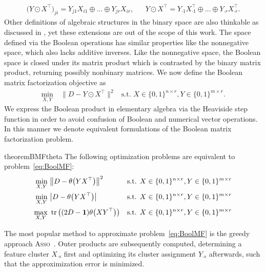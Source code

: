 \begin{align*}
    \bigl(Y\odot X^\top\bigr)_{ji}=Y_{j1}X_{i1}\oplus \ldots \oplus Y_{jr}X_{ir},&& Y\odot X^\top = Y_{\cdot 1}X_{\cdot 1}^\top\oplus \ldots \oplus Y_{\cdot r}X_{\cdot r}^\top.
\end{align*}
Other definitions of algebraic structures in the binary space are also thinkable as discussed in \cite{miettinen2015generalized}, yet these extensions are out of the scope of this work.
The space defined via the Boolean operations has similar properties like the nonnegative space, which also lacks additive inverses. Like the nonnegative space, the Boolean space is closed under its matrix product which is contrasted by the binary matrix product, returning possibly nonbinary matrices. We now define the Boolean matrix factorization objective as
\begin{align} \label{eq:BoolMF}
\min_{X,Y}\ &\bigl\lVert D-Y\odot X^\top\bigr\rVert ^2 & \text{s.t. } X\in\{0,1\}^{n\times r},Y\in\{0,1\}^{m\times r}. \tag{BMF}
\end{align}
We express the Boolean product in elementary algebra via the Heaviside step function in order to avoid confusion of Boolean and numerical vector operations. In this manner we denote equivalent formulations of the Boolean matrix factorization problem.
\begin{restatable}{theorem}{BMFtheta}\label{thm:BMFtheta}
The following optimization problems are equivalent to problem~\eqref{eq:BoolMF}:
\begin{align}
    \label{eq:BoolMF_theta}
    \min_{X,Y}\ & \bigl\lVert D-\theta\bigl(YX^\top\bigr)\bigr\rVert ^2 & \text{s.t. } X\in\{0,1\}^{n\times r},Y\in\{0,1\}^{m\times r}\\
    \label{eq:BoolMF_abs}
    \min_{X,Y}\ & \bigl\lvert D-\theta\bigl(YX^\top\bigr)\bigr\rvert  & \text{s.t. } X\in\{0,1\}^{n\times r},Y\in\{0,1\}^{m\times r}\\
    \label{eq:BoolMF_thetaTr}
    \max_{X,Y}\ & \operatorname*{tr}\left( (2D-\mathbf{1})\theta\bigl(XY^\top\bigr)\right) & \text{s.t. } X\in\{0,1\}^{n\times r},Y\in\{0,1\}^{m\times r}
\end{align}
\end{restatable}
The most popular method to approximate problem~\eqref{eq:BoolMF} is the greedy approach \textsc{Asso}~\citep{miettinen2008discrete}. Outer products are subsequently computed, determining a feature cluster $X_{\cdot s}$ first and optimizing its cluster assignment $Y_{\cdot s}$ afterwards, such that the approximization error is minimized. 

